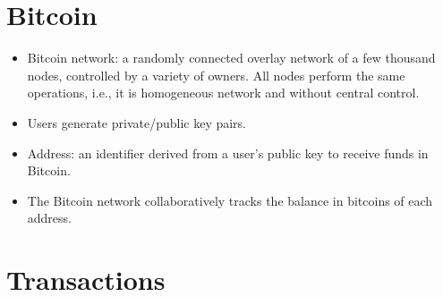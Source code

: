 \documentclass{article}
\begin{document}
\section{Bitcoin}

\begin{itemize}
  \item Bitcoin network: a randomly connected overlay network of a few thousand
    nodes, controlled by a variety of owners. All nodes perform the same
    operations, i.e., it is homogeneous network and without central control.
  \item Users generate private/public key pairs.
  \item Address: an identifier derived from a user's public key to receive funds
    in Bitcoin.
  \item The Bitcoin network collaboratively tracks the balance in bitcoins of
    each address.
\end{itemize}

\section{Transactions}
\end{document}
